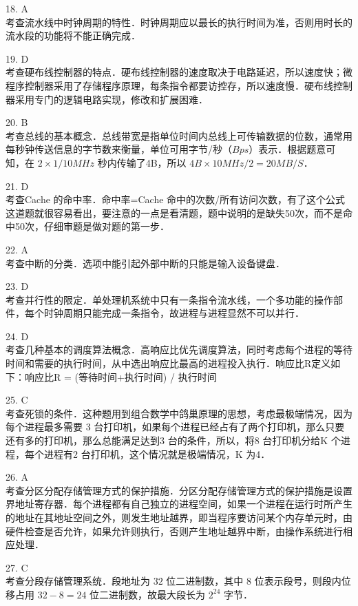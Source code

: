 18. A \\
考查流水线中时钟周期的特性．时钟周期应以最长的执行时间为准，否则用时长的流水段的功能将不能正确完成．

19. D \\
考查硬布线控制器的特点．硬布线控制器的速度取决于电路延迟，所以速度快；微程序控制器采用了存储程序原理，每条指令都要访控存，所以速度慢．硬布线控制器采用专门的逻辑电路实现，修改和扩展困难．

20. B \\
考查总线的基本概念．总线带宽是指单位时间内总线上可传输数据的位数，通常用每秒钟传送信息的字节数来衡量，单位可用字节/秒（$Bps$）表示．根据题意可知，在 $2\times1/10MHz$ 秒内传输了4B，所以 $4B\times10MHz/2=20MB/S$．

21. D \\
考查Cache 的命中率．命中率=Cache 命中的次数/所有访问次数，有了这个公式这道题就很容易看出，要注意的一点是看清题，题中说明的是缺失50次，而不是命中50次，仔细审题是做对题的第一步．

22. A \\
考查中断的分类．选项中能引起外部中断的只能是输入设备键盘．

23. D \\
考查并行性的限定．单处理机系统中只有一条指令流水线，一个多功能的操作部件，每个时钟周期只能完成一条指令，故进程与进程显然不可以并行．

24. D \\
考查几种基本的调度算法概念．高响应比优先调度算法，同时考虑每个进程的等待时间和需要的执行时间，从中选出响应比最高的进程投入执行．响应比R定义如下：响应比R = (等待时间+执行时间) / 执行时间

25. C \\
考查死锁的条件．这种题用到组合数学中鸽巢原理的思想，考虑最极端情况，因为每个进程最多需要 3 台打印机，如果每个进程已经占有了两个打印机，那么只要还有多的打印机，那么总能满足达到3 台的条件，所以，将8 台打印机分给K 个进程，每个进程有2 台打印机，这个情况就是极端情况，K 为4．

26. A \\
考查分区分配存储管理方式的保护措施．分区分配存储管理方式的保护措施是设置界地址寄存器．每个进程都有自己独立的进程空间，如果一个进程在运行时所产生的地址在其地址空间之外，则发生地址越界，即当程序要访问某个内存单元时，由硬件检查是否允许，如果允许则执行，否则产生地址越界中断，由操作系统进行相应处理．

27. C \\
考查分段存储管理系统．段地址为 $32$ 位二进制数，其中 $8$ 位表示段号，则段内位移占用 $32-8=24$ 位二进制数，故最大段长为 $2^{24}$ 字节．

